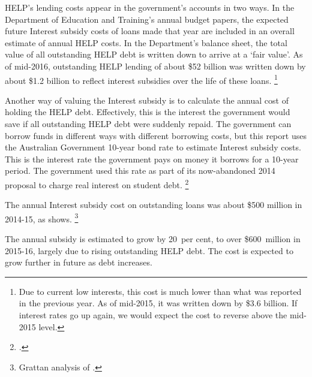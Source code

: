 \documentclass[embargoed]{grattan}
\begin{document}
\gls{HELP}'s lending costs appear in the government's accounts in two ways.
In the Department of Education and Training's annual budget papers, the expected future \gls{Interest subsidy} costs of loans made that year are included in an overall estimate of annual \gls{HELP} costs.
In the Department's balance sheet, the total value of all outstanding \gls{HELP} debt is written down to arrive at a `fair value'.
As of mid-2016, outstanding \gls{HELP} lending of about \$52 billion was written down by about \$1.2 billion to reflect interest subsidies over the life of these loans.%
\footnote{Due to current low interests, this cost is much lower than what was reported in the previous year. As of mid-2015, it was written down by \$3.6 billion. If interest rates go up again, we would expect the cost to reverse above the mid-2015 level.\textcite[][176]{Education2016Annualreport}}

Another way of valuing the \gls{Interest subsidy} is to calculate the annual cost of holding the \gls{HELP} debt.
Effectively, this is the interest the government would save if all outstanding \gls{HELP} debt were suddenly repaid.
The government can borrow funds in different ways with different borrowing costs, but this report uses the Australian Government 10-year bond rate to estimate \gls{Interest subsidy} costs.
This is the interest rate the government pays on money it borrows for a 10-year period.
The government used this rate as part of its now-abandoned 2014 proposal to charge real interest on student debt.%
\footcite{Australia2014HigherEducationResearch}

The annual \gls{Interest subsidy} cost on outstanding loans was about \$500 million in 2014-15, as  shows.%
\footnote{Grattan analysis of \textcites{ABS2016ConsumerPriceIndex}{RBA-2015-f2Capitalmarketyields}{RBA2016F21Capitalmarket}.} 

The annual subsidy is estimated to grow by 20~per cent, to over \$600~million in 2015-16, largely due to rising outstanding \gls{HELP} debt.
The cost is expected to grow further in future as debt increases.
\end{document}
